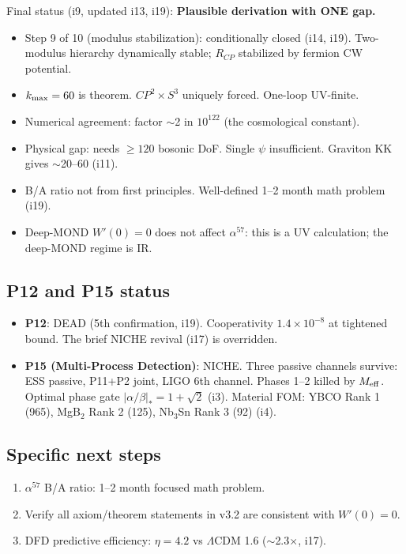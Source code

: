 \documentclass[11pt]{article}
\begin{document}
Final status (i9, updated i13, i19): \textbf{Plausible derivation with ONE gap.}
\begin{itemize}
\item Step 9 of 10 (modulus stabilization): conditionally closed (i14, i19).
Two-modulus hierarchy dynamically stable; $R_{CP}$ stabilized by fermion CW potential.
\item $k_{\rm max} = 60$ is theorem. $CP^2 \times S^3$ uniquely forced. One-loop UV-finite.
\item Numerical agreement: factor $\sim$2 in $10^{122}$ (the cosmological constant).
\item Physical gap: needs $\geq 120$ bosonic DoF. Single $\psi$ insufficient.
Graviton KK gives $\sim$20--60 (i11).
\item B/A ratio not from first principles. Well-defined 1--2 month math problem (i19).
\item Deep-MOND $W'(0) = 0$ does not affect $\alpha^{57}$: this is a UV calculation;
the deep-MOND regime is IR.
\end{itemize}

\subsection{P12 and P15 status}
\begin{itemize}
\item \textbf{P12}: DEAD (5th confirmation, i19). Cooperativity $1.4 \times 10^{-8}$
at tightened bound. The brief NICHE revival (i17) is overridden.
\item \textbf{P15 (Multi-Process Detection)}: NICHE. Three passive channels survive:
ESS passive, P11+P2 joint, LIGO 6th channel. Phases 1--2 killed by $M_{\rm eff}$.
Optimal phase gate $|\alpha/\beta|_* = 1 + \sqrt{2}$ (i3). Material FOM: YBCO
Rank 1 (965), MgB$_2$ Rank 2 (125), Nb$_3$Sn Rank 3 (92) (i4).
\end{itemize}

\subsection{Specific next steps}
\begin{enumerate}
\item $\alpha^{57}$ B/A ratio: 1--2 month focused math problem.
\item Verify all axiom/theorem statements in v3.2 are consistent with $W'(0) = 0$.
\item DFD predictive efficiency: $\eta = 4.2$ vs $\Lambda$CDM 1.6 ($\sim$2.3$\times$, i17).
\end{enumerate}
\end{document}
